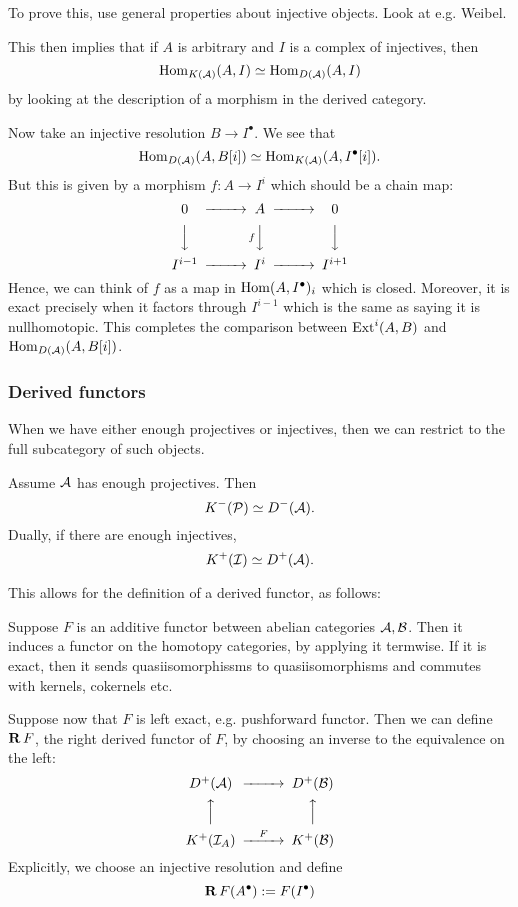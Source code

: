 To prove this, use general properties about injective objects. Look at e.g. Weibel.

This then implies that if $A$ is arbitrary and $I$ is a complex of injectives, then $$\operatorname{Hom}_{K(\mathcal{A})}(A,I)\simeq \operatorname{Hom}_{D(\mathcal{A})}(A,I)$$by looking at the description of a morphism in the derived category.

Now take an injective resolution $B\rightarrow I^\bullet$. We see that $$\operatorname{Hom}_{D(\mathcal{A})}(A,B[i])\simeq \operatorname{Hom}_{K(\mathcal{A})}(A,I^\bullet[i]).$$But this is given by a morphism $f:A\rightarrow I^i$ which should be a chain map:
$$\begin{CD}0 @> > > A @> > > 0 \\ @VVV @VfVV @VVV \\ I^{i-1} @> > > I^i @> > > I^{i+1} \end{CD}$$
Hence, we can think of $f$ as a map in $\operatorname{Hom}(A, I^\bullet)_{i}$ which is closed. Moreover, it is exact precisely when it factors through $I^{i-1}$ which is the same as saying it is nullhomotopic. This completes the comparison between $\operatorname{Ext}^i(A,B)$ and $\operatorname{Hom}_{D(\mathcal{A})}(A,B[i])$.

\subsubsection{Derived functors}
When we have either enough projectives or injectives, then we can restrict to the full subcategory of such objects.

\begin{theorem}{}{}
    Assume $\mathcal{A}$ has enough projectives. Then $$K^{-}(\mathcal{P})\simeq D^{-}(\mathcal{A}).$$Dually, if there are enough injectives, $$K^{+}(\mathcal{I})\simeq D^{+}(\mathcal{A}).$$
\end{theorem}

This allows for the definition of a derived functor, as follows:

Suppose $F$ is an additive functor between abelian categories $\mathcal{A}, \mathcal{B}$. Then it induces a functor on the homotopy categories, by applying it termwise. If it is exact, then it sends quasiisomorphissms to quasiisomorphisms and commutes with kernels, cokernels etc.

Suppose now that $F$ is left exact, e.g. pushforward functor. Then we can define $\operatorname{\mathbf{R}} F$, the right derived functor of $F$, by choosing an inverse to the equivalence on the left:  $$\begin{CD} D^+(\calA) @> > > D^+(\calB) \\ @A A A  @A A A \\ K^+(\mathcal{I}_{A})@> F> >K^+(\calB) \end{CD}$$
Explicitly, we choose an injective resolution and define $$\operatorname{\mathbf{R}} F(A^\bullet):=F(I^\bullet)$$

